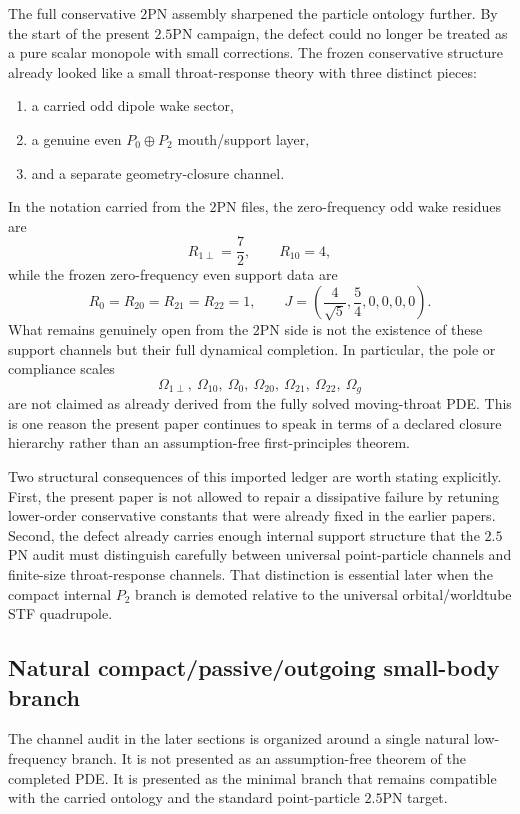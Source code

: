 \documentclass[11pt]{article}
\begin{document}
The full conservative $2$PN assembly sharpened the particle ontology further.  By the
start of the present $2.5$PN campaign, the defect could no longer be treated as a pure
scalar monopole with small corrections.  The frozen conservative structure already looked
like a small throat-response theory with three distinct pieces:
\begin{enumerate}
  \item a carried odd dipole wake sector,
  \item a genuine even $P_0\oplus P_2$ mouth/support layer,
  \item and a separate geometry-closure channel.
\end{enumerate}
In the notation carried from the $2$PN files, the zero-frequency odd wake residues are
\[
R_{1\perp}=\frac72,
\qquad
R_{10}=4,
\]
while the frozen zero-frequency even support data are
\[
R_0=R_{20}=R_{21}=R_{22}=1,
\qquad
J=\left(\frac{4}{\sqrt5},\frac54,0,0,0,0\right).
\]
What remains genuinely open from the $2$PN side is not the existence of these support
channels but their full dynamical completion.  In particular, the pole or compliance
scales
\[
\Omega_{1\perp},\ \Omega_{10},\ \Omega_0,
\ \Omega_{20},\ \Omega_{21},\ \Omega_{22},\ \Omega_g
\]
are not claimed as already derived from the fully solved moving-throat PDE.  This is one
reason the present paper continues to speak in terms of a declared closure hierarchy
rather than an assumption-free first-principles theorem.

Two structural consequences of this imported ledger are worth stating explicitly.  First,
the present paper is not allowed to repair a dissipative failure by retuning lower-order
conservative constants that were already fixed in the earlier papers.  Second, the defect
already carries enough internal support structure that the $2.5$PN audit must distinguish
carefully between universal point-particle channels and finite-size throat-response
channels.  That distinction is essential later when the compact internal $P_2$ branch is
demoted relative to the universal orbital/worldtube STF quadrupole.

\subsection{Natural compact/passive/outgoing small-body branch}
\label{sec:dictionary-target-branch}

The channel audit in the later sections is organized around a single natural low-frequency
branch.  It is not presented as an assumption-free theorem of the completed PDE.  It is
presented as the minimal branch that remains compatible with the carried ontology and the
standard point-particle $2.5$PN target.
\end{document}

